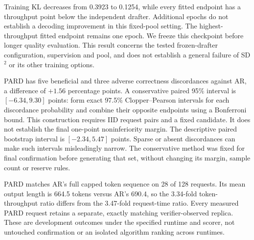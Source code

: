 \documentclass{article}
\begin{document}
\begin{table}[H]
\caption{SD$^2$ epoch budget at fixed 512 distinct examples. Training KL
is the mean over updates in each final epoch. It is not held-out loss.
Independent-drafter throughput is 18.75 tokens/s. Intervals resample
paired requests and do not adjust for model selection.}
\label{tab:sd-square-epochs}
\centering\footnotesize
\setlength{\tabcolsep}{3pt}

\end{table}

Training KL decreases from 0.3923 to 0.1254, while every fitted endpoint
has a throughput point below the independent drafter. Additional epochs
do not establish a decoding improvement in this fixed-pool setting.
The highest-throughput fitted endpoint remains one epoch. We freeze
this checkpoint before longer quality evaluation. This result concerns
the tested frozen-drafter configuration, supervision and pool, and does
not establish a general failure of SD$^2$ or its other training options.

\begin{table}[H]
\caption{PARD capped answer quality on 128 exposed MATH development
requests, after an eight-request pilot passed. Both methods use the
same 2048-token cap and public BF16 eager runtime. Cap hits include
all outputs reaching the cap. None ends in EOS exactly at the cap.}
\label{tab:pard-quality}
\centering\footnotesize

\end{table}

PARD has five beneficial and three adverse correctness discordances
against AR, a difference of $+1.56$ percentage points. A conservative
paired 95\% interval is $[-6.34,9.30]$ points: form exact 97.5\%
Clopper--Pearson intervals for each discordance probability and combine
their opposite endpoints using a Bonferroni bound. This construction
requires IID request pairs and a fixed candidate. It does not establish
the final one-point noninferiority margin. The descriptive paired
bootstrap interval is $[-2.34,5.47]$ points. Sparse or absent discordances
can make such intervals misleadingly narrow. The conservative method
was fixed for final confirmation before generating that set, without
changing its margin, sample count or reserve rules.

PARD matches AR's full capped token sequence on 28 of 128 requests.
Its mean output length is 664.5 tokens versus AR's 690.4, so the
3.34-fold token-throughput ratio differs from the 3.47-fold request-time
ratio. Every measured PARD request retains a separate, exactly matching
verifier-observed replica. These are development outcomes under the
specified runtime and scorer, not untouched confirmation or an isolated
algorithm ranking across runtimes.
\end{document}
